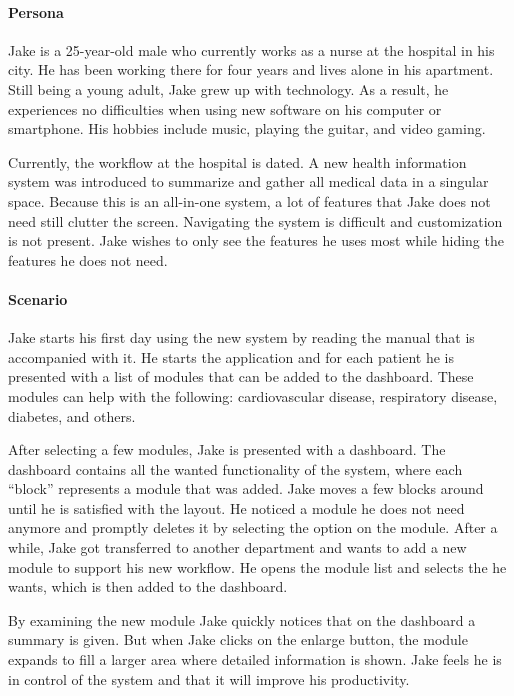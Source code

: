         \paragraph{Persona} Jake is a 25-year-old male who currently works as a nurse at the hospital in his city. He has been working there for four years and lives alone in his apartment. Still being a young adult, Jake grew up with technology. As a result, he experiences no difficulties when using new software on his computer or smartphone. His hobbies include music, playing the guitar, and video gaming.

        Currently, the workflow at the hospital is dated. A new health information system was introduced to summarize and gather all medical data in a singular space. Because this is an all-in-one system, a lot of features that Jake does not need still clutter the screen. Navigating the system is difficult and customization is not present. Jake wishes to only see the features he uses most while hiding the features he does not need.
        
        \paragraph{Scenario} Jake starts his first day using the new system by reading the manual that is accompanied with it. He starts the application and for each patient he is presented with a list of modules that can be added to the dashboard. These modules can help with the following: cardiovascular disease, respiratory disease, diabetes, and others.

        After selecting a few modules, Jake is presented with a dashboard. The dashboard contains all the wanted functionality of the system, where each ``block'' represents a module that was added. Jake moves a few blocks around until he is satisfied with the layout. He noticed a module he does not need anymore and promptly deletes it by selecting the option on the module. After a while, Jake got transferred to another department and wants to add a new module to support his new workflow. He opens the module list and selects the he wants, which is then added to the dashboard.

        By examining the new module Jake quickly notices that on the dashboard a summary is given. But when Jake clicks on the enlarge button, the module expands to fill a larger area where detailed information is shown. Jake feels he is in control of the system and that it will improve his productivity.\bigskip
        

